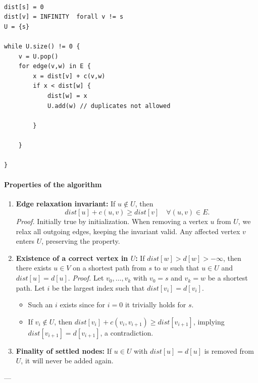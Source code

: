 \documentclass{article}
\begin{document}
\begin{verbatim}

dist[s] = 0
dist[v] = INFINITY  forall v != s
U = {s}

while U.size() != 0 {
    v = U.pop()
    for edge(v,w) in E {
        x = dist[v] + c(v,w)
        if x < dist[w] {
            dist[w] = x
            U.add(w) // duplicates not allowed
            
        }
        
    }
    
}
\end{verbatim}


\paragraph{Properties of the algorithm}

\begin{enumerate}
    \item \textbf{Edge relaxation invariant:}  
    If $u \notin U$, then
    \[
        dist[u] + c(u,v) \geq dist[v] \quad \forall (u,v) \in E.
    \]
    \emph{Proof.} Initially true by initialization.  
    When removing a vertex $u$ from $U$, we relax all outgoing edges, keeping the invariant valid.  
    Any affected vertex $v$ enters $U$, preserving the property.

    \item \textbf{Existence of a correct vertex in $U$:}  
    If $dist[w] > d[w] > -\infty$, then there exists $u \in V$ on a shortest path from $s$ to $w$ such that $u \in U$ and $dist[u] = d[u]$.  
    \emph{Proof.}  
    Let $v_0, \dots, v_k$ with $v_0 = s$ and $v_k = w$ be a shortest path.  
    Let $i$ be the largest index such that $dist[v_i] = d[v_i]$.
    \begin{itemize}
        \item Such an $i$ exists since for $i=0$ it trivially holds for $s$.
        \item If $v_i \notin U$, then $dist[v_i] + c(v_i,v_{i+1}) \geq dist[v_{i+1}]$, implying $dist[v_{i+1}] = d[v_{i+1}]$, a contradiction.
    \end{itemize}

    \item \textbf{Finality of settled nodes:}  
    If $u \in U$ with $dist[u] = d[u]$ is removed from $U$, it will never be added again.
\end{enumerate}

---
\end{document}

